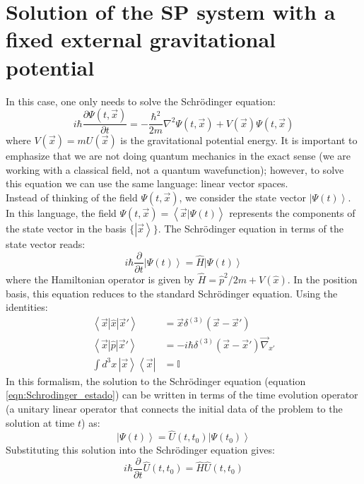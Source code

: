 \documentclass[12pt]{article}
\newcommand{\ket}[1]{ \left|#1\right>}
\newcommand{\braket}[2]{\left< #1 | #2 \right>}
\begin{document}
\section*{Solution of the SP system with a fixed external gravitational potential}
In this case, one only needs to solve the Schrödinger equation:
\begin{equation}
    i\hbar \frac{\partial \Psi(t,\vec{x})}{\partial t}=-\frac{\hbar^2}{2m}\nabla^{2}\Psi(t,\vec{x})+V(\vec{x})\Psi(t,\vec{x})
\end{equation}
where $V(\vec{x})=mU(\vec{x})$ is the gravitational potential energy. It is important to emphasize that we are not doing quantum mechanics in the exact sense (we are working with a classical field, not a quantum wavefunction); however, to solve this equation we can use the same language: linear vector spaces. \\
Instead of thinking of the field $\Psi(t,\vec{x})$, we consider the state vector $\ket{\Psi(t)}$. In this language, the field $\Psi(t,\vec{x})=\braket{\vec{x}}{\Psi(t)}$ represents the components of the state vector in the basis $\{\ket{\vec{x}}\}$. The Schrödinger equation in terms of the state vector reads:
\begin{equation}
\label{eqn:Schrodinger_estado}
    i\hbar \frac{\partial}{\partial t} \ket{\Psi(t)}=\hat{H}\ket{\Psi(t)}
\end{equation}
where the Hamiltonian operator is given by $\hat{H}=\hat{p}^2/2m+V(\hat{x})$. In the position basis, this equation reduces to the standard Schrödinger equation. Using the identities:
\begin{align}
    \braket{\vec{x}}{\hat{x}|\vec{x}'}&=\vec{x}\delta^{(3)}(\vec{x}-\vec{x}') \\
    \braket{\vec{x}}{\hat{p}|\vec{x}'}&=-i\hbar\delta^{(3)}(\vec{x}-\vec{x}')\vec{\nabla}_{x'} \\
    \int d^{3}x \, \ket{\vec{x}}\left<\vec{x}\right|&=\mathbb{I}
\end{align}
In this formalism, the solution to the Schrödinger equation (equation \ref{eqn:Schrodinger_estado}) can be written in terms of the time evolution operator (a unitary linear operator that connects the initial data of the problem to the solution at time $t$) as:
\begin{equation}
    \ket{\Psi(t)}=\hat{U}(t,t_0)\ket{\Psi(t_0)}
\end{equation}
Substituting this solution into the Schrödinger equation gives:
\begin{equation}
\label{eqn:Schrodinger_U}
    i\hbar \frac{\partial}{\partial t} \hat{U}(t,t_0)=\hat{H}\hat{U}(t,t_0)
\end{equation}
\end{document}

